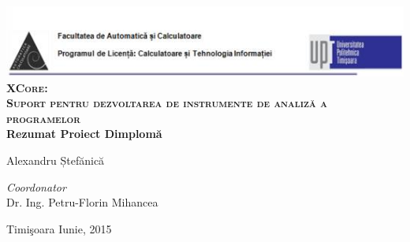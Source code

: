 \begin{titlepage}
	\begin{center}	
		\includegraphics[width=\textwidth]{img/header.jpg}\\[4cm]
		
		{\huge \bfseries \textsc{XCore:\vspace{2.5mm}\\ Suport pentru dezvoltarea de
instrumente \vspace{2.5mm} de analiză a programelor}}
		\\[3cm]
		
		{\bfseries Rezumat Proiect Dimplomă} \\[2.3cm]
								
		\begin{flushright}
				\large Alexandru Ștefănică \\[1cm]
		\end{flushright}
		\begin{flushleft}
			 \large
				\emph{Coordonator} \\
				Dr. Ing. Petru-Florin Mihancea \\[1cm]
		\end{flushleft}
		
		{\large {Timi\c{s}oara Iunie, 2015}}
	\end{center}
\end{titlepage}
